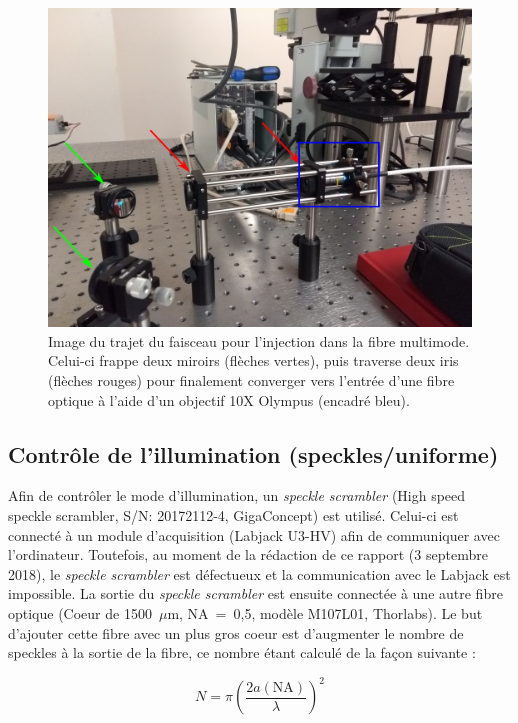 \documentclass{article}       %
\begin{document}
\begin{figure}[H]
    \centering
    \includegraphics[scale=0.75]{fig/InjectionMod.PNG}
    \caption{Image du trajet du faisceau pour l'injection dans la fibre multimode. Celui-ci frappe deux miroirs (flèches vertes), puis traverse deux iris (flèches rouges) pour finalement converger vers l'entrée d'une fibre optique à l'aide d'un objectif 10X Olympus (encadré bleu).}
    \label{Fig:Inject}
\end{figure}

\subsection{Contrôle de l'illumination (speckles/uniforme)}

Afin de contrôler le mode d'illumination, un \textit{speckle scrambler} (High speed speckle scrambler, S/N: 20172112-4, GigaConcept) est utilisé. Celui-ci est connecté à un module d'acquisition (Labjack U3-HV) afin de communiquer avec l'ordinateur. Toutefois, au moment de la rédaction de ce rapport (3 septembre 2018), le \textit{speckle scrambler} est défectueux et la communication avec le Labjack est impossible. La sortie du \textit{speckle scrambler} est ensuite connectée à une autre fibre optique (Coeur de 1500~$\mu$m, NA~=~0,5, modèle M107L01, Thorlabs). Le but d'ajouter cette fibre avec un plus gros coeur est d'augmenter le nombre de speckles à la sortie de la fibre, ce nombre étant calculé de la façon suivante \cite{FiberStats}:

\begin{equation*}
    N = \pi\left(\frac{2a(\text{NA})}{\lambda}\right)^2
\end{equation*}
\end{document}

